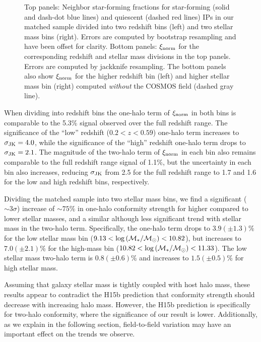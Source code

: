 \begin{figure*}
  \epstrim{0.2in 0.3in 0.4in 0.8in}
  \caption{
Top panels: Neighbor star-forming fractions for star-forming (solid and dash-dot blue lines) and quiescent (dashed red lines) IPs in our matched sample divided into two redshift bins (left) and two stellar mass bins (right).  Errors are computed by bootstrap resampling and have been offset for clarity.
Bottom panels: $\signorm$ for the corresponding redshift and stellar mass divisions in the top panels.  Errors are computed by jackknife resampling.
The bottom panels also show $\signorm$ for the higher redshift bin (left) and higher stellar mass bin (right) computed \emph{without} the COSMOS field (dashed gray line).
}
  \label{fig:latefrac_normsig_compare}
\end{figure*}

When dividing into redshift bins the one-halo term of $\signorm$ in both bins is comparable to the 5.3\% signal observed over the full redshift range.
The significance of the ``low'' redshift (${0.2<z<0.59}$) one-halo term increases to 
${\sigmaJK=4.0}$, while the significance of the ``high'' redshift one-halo term drops to ${\sigmaJK=2.1}$.
The magnitude of the two-halo term of $\signorm$ in each bin also remains comparable to the full redshift range signal of 1.1\%, but the uncertainty in each bin also increases,
reducing $\sigmaJK$ from 2.5 for the full redshift range to 1.7 and 1.6 for the low and high redshift bins, respectively.

Dividing the matched sample into two stellar mass bins, we find a significant ($\sim3\sigma$) increase of $\sim75\%$ in one-halo conformity strength for higher compared to lower stellar masses, and a similar although less significant trend with stellar mass in the two-halo term.
Specifically, the one-halo term drops to ${3.9(\pm1.3)}$\% for the low stellar mass bin (${9.13<\logM<10.82}$), but
increases to ${7.0(\pm2.1)}$\% for the high-mass bin (${10.82<\logM<11.33}$).
The low stellar mass two-halo term is ${0.8(\pm0.6)}$\% and increases to ${1.5(\pm0.5)}$\% for high stellar mass.

Assuming that galaxy stellar mass is tightly coupled with host halo mass, these results appear to contradict the H15b prediction that conformity strength should decrease with increasing halo mass.
However, the H15b prediction is specifically for two-halo conformity, where the significance of our result is lower.
Additionally, as we explain in the following section, field-to-field variation may have an important effect on the trends we observe.

